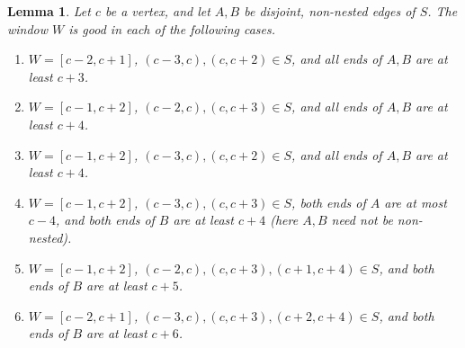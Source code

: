 \documentclass[11pt]{amsart}
\newtheorem{lemma}[theorem]{Lemma}
\theoremstyle{definition}\newtheorem{problem}{Problem}
\theoremstyle{remark}\newtheorem*{remark}{Remark}
\begin{document}
\begin{lemma}\label{lem:windows}
Let $c$ be a vertex, and let $A,B$ be disjoint, non-nested edges of $S$. The window $W$ is good in each of the
following cases.
\begin{enumerate}
\item[(a)] $W=[c-2,c+1]$, $(c-3,c),(c,c+2)\in S$, and all ends of $A,B$ are at least $c+3$.
\item[(b)] $W=[c-1,c+2]$, $(c-2,c),(c,c+3)\in S$, and all ends of $A,B$ are at least $c+4$.
\item[(c)] $W=[c-1,c+2]$, $(c-3,c),(c,c+2)\in S$, and all ends of $A,B$ are at least $c+4$.
\item[(d)] $W=[c-1,c+2]$, $(c-3,c),(c,c+3)\in S$, both ends of $A$ are at most $c-4$, and both ends of $B$ are at
least $c+4$ (here $A,B$ need not be non-nested).
\item[(e)] $W=[c-1,c+2]$, $(c-2,c),(c,c+3),(c+1,c+4)\in S$, and both ends of $B$ are at least $c+5$.
\item[(f)] $W=[c-2,c+1]$, $(c-3,c),(c,c+3),(c+2,c+4)\in S$, and both ends of $B$ are at least $c+6$.
\end{enumerate}
\end{lemma}
\end{document}

